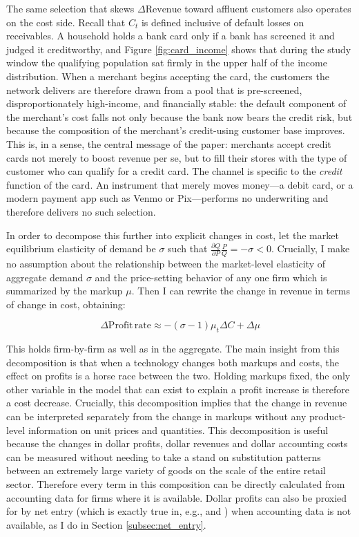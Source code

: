\documentclass[12pt,english]{article}
\begin{document}
The same selection that skews $\Delta \mathrm{Revenue}$ toward affluent customers also operates on the cost side. Recall that $C_t$ is defined inclusive of default losses on receivables. A household holds a bank card only if a bank has screened it and judged it creditworthy, and Figure \ref{fig:card_income} shows that during the study window the qualifying population sat firmly in the upper half of the income distribution. When a merchant begins accepting the card, the customers the network delivers are therefore drawn from a pool that is pre-screened, disproportionately high-income, and financially stable: the default component of the merchant's cost falls not only because the bank now bears the credit risk, but because the composition of the merchant's credit-using customer base improves. This is, in a sense, the central message of the paper: merchants accept credit cards not merely to boost revenue per se, but to fill their stores with the type of customer who can qualify for a credit card. The channel is specific to the \emph{credit} function of the card. An instrument that merely moves money---a debit card, or a modern payment app such as Venmo or Pix---performs no underwriting and therefore delivers no such selection.

In order to decompose this further into explicit changes in cost, let the market equilibrium elasticity of demand be $\sigma$ such that $\frac{\partial Q}{ \partial P} \frac{P}{Q} = -\sigma < 0$. Crucially, I make no assumption about the relationship between the market-level elasticity of aggregate demand $\sigma$ and the price-setting behavior of any one firm which is summarized by the markup $\mu$. Then I can rewrite the change in revenue in terms of change in cost, obtaining:

\begin{equation}\label{eq:decomposition3}
    \Delta \mathrm{Profit\,rate} \approx - \left(\sigma-1\right) \mu_t  \Delta C + \Delta \mu 
\end{equation}

This holds firm-by-firm as well as in the aggregate. The main insight from this decomposition is that when a technology changes both markups and costs, the effect on profits is a horse race between the two. Holding markups fixed, the only other variable in the model that can exist to explain a profit increase is therefore a cost decrease. Crucially, this decomposition implies that the change in revenue can be interpreted separately from the change in markups without any product-level information on unit prices and quantities. This decomposition is useful because the changes in dollar profits, dollar revenues and dollar accounting costs can be measured without needing to take a stand on substitution patterns between an extremely large variety of goods on the scale of the entire retail sector. Therefore every term in this composition can be directly calculated from accounting data for firms where it is available. Dollar profits can also be proxied for by net entry (which is exactly true in, e.g., \cite{hopenhayn_entry_1992} and \cite{melitz_impact_2003}) when accounting data is not available, as I do in Section \ref{subsec:net_entry}. 
\end{document}
